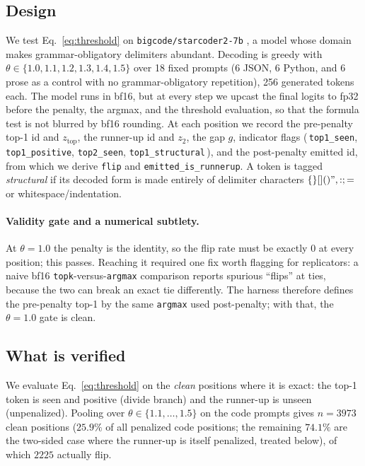 \documentclass[11pt]{article}
\newcommand{\ztop}{z_{\mathrm{top}}}
\newcommand{\thp}{\theta}
\newcommand{\code}[1]{\texttt{#1}}
\begin{document}
\subsection{Design}
\label{sec:a2-design}

We test Eq.~\eqref{eq:threshold} on \code{bigcode/starcoder2-7b}
\citep{lozhkov2024starcoder2}, a model whose domain makes grammar-obligatory delimiters
abundant. Decoding is greedy with $\thp \in \{1.0,1.1,1.2,1.3,1.4,1.5\}$ over 18 fixed
prompts (6 JSON, 6 Python, and 6 prose as a control with no grammar-obligatory repetition),
256 generated tokens each. The model runs in bf16, but at every step we upcast the final
logits to fp32 before the penalty, the argmax, and the threshold evaluation, so that the
formula test is not blurred by bf16 rounding. At each position we record the pre-penalty
top-1 id and $\ztop$, the runner-up id and $z_2$, the gap $g$, indicator flags
(\,\code{top1\_seen}, \code{top1\_positive}, \code{top2\_seen}, \code{top1\_structural}\,),
and the post-penalty emitted id, from which we derive \code{flip} and
\code{emitted\_is\_runnerup}. A token is tagged \emph{structural} if its decoded form is
made entirely of delimiter characters $\{\}[]()",:;=$ or whitespace/indentation.

\paragraph{Validity gate and a numerical subtlety.} At $\thp=1.0$ the penalty is the
identity, so the flip rate must be exactly $0$ at every position; this passes. Reaching it
required one fix worth flagging for replicators: a naive bf16 \code{topk}-versus-\code{argmax}
comparison reports spurious ``flips'' at ties, because the two can break an exact tie
differently. The harness therefore defines the pre-penalty top-1 by the same \code{argmax}
used post-penalty; with that, the $\thp=1.0$ gate is clean.

\subsection{What is verified}
\label{sec:a2-verified}

We evaluate Eq.~\eqref{eq:threshold} on the \emph{clean} positions where it is exact: the
top-1 token is seen and positive (divide branch) and the runner-up is unseen (unpenalized).
Pooling over $\thp \in \{1.1,\dots,1.5\}$ on the code prompts gives $n=3973$ clean
positions ($25.9\%$ of all penalized code positions; the remaining $74.1\%$ are the
two-sided case where the runner-up is itself penalized, treated below), of which $2225$
actually flip.
\end{document}
